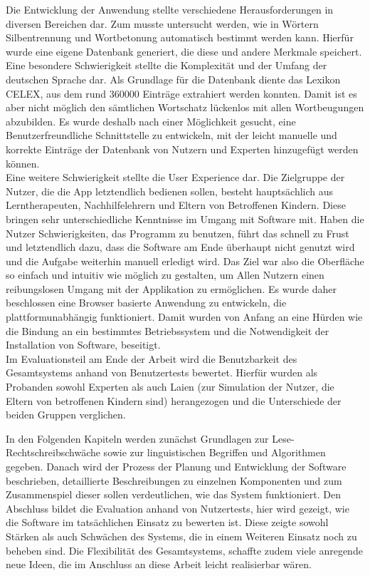 Die Entwicklung der Anwendung stellte verschiedene Herausforderungen in diversen Bereichen dar. Zum musste untersucht werden, wie in Wörtern Silbentrennung und Wortbetonung automatisch bestimmt werden kann. Hierfür wurde eine eigene Datenbank generiert, die diese und andere Merkmale speichert. Eine besondere Schwierigkeit stellte die Komplexität und der Umfang der deutschen Sprache dar. Als Grundlage für die Datenbank diente das Lexikon CELEX, aus dem rund 360000 Einträge extrahiert werden konnten. Damit ist es aber nicht möglich den sämtlichen Wortschatz lückenlos mit allen Wortbeugungen abzubilden. Es wurde deshalb nach einer Möglichkeit gesucht, eine Benutzerfreundliche Schnittstelle zu entwickeln, mit der leicht manuelle und korrekte Einträge der Datenbank von Nutzern und Experten hinzugefügt werden können.\\
Eine weitere Schwierigkeit stellte die User Experience dar. Die Zielgruppe der Nutzer, die die App letztendlich bedienen sollen, besteht hauptsächlich aus Lerntherapeuten, Nachhilfelehrern und Eltern von Betroffenen Kindern. Diese bringen sehr unterschiedliche Kenntnisse im Umgang mit Software mit. Haben die Nutzer Schwierigkeiten, das Programm zu benutzen, führt das schnell zu Frust und letztendlich dazu, dass die Software am Ende überhaupt nicht genutzt wird und die Aufgabe weiterhin manuell erledigt wird.  Das Ziel war also die Oberfläche so einfach und intuitiv wie möglich zu gestalten, um Allen Nutzern einen reibungslosen Umgang mit der Applikation zu ermöglichen. Es wurde daher beschlossen eine Browser basierte Anwendung zu entwickeln, die plattformunabhängig funktioniert. Damit wurden von Anfang an eine Hürden wie die Bindung an ein bestimmtes Betriebssystem und die Notwendigkeit der Installation von Software, beseitigt.\\
Im Evaluationsteil am Ende der Arbeit wird die Benutzbarkeit des Gesamtsystems anhand von Benutzertests bewertet. Hierfür wurden als Probanden sowohl Experten  als auch Laien (zur Simulation der Nutzer, die Eltern von betroffenen Kindern sind) herangezogen und die Unterschiede der beiden Gruppen verglichen.

In den Folgenden Kapiteln werden zunächst Grundlagen zur Lese-Rechtschreibschwäche sowie zur linguistischen Begriffen und Algorithmen gegeben. Danach wird der Prozess der Planung und Entwicklung der Software beschrieben, detaillierte Beschreibungen zu einzelnen Komponenten und zum Zusammenspiel dieser sollen verdeutlichen, wie das System funktioniert. Den Abschluss bildet die Evaluation anhand von Nutzertests, hier wird gezeigt, wie die Software im tatsächlichen Einsatz zu bewerten ist. Diese zeigte sowohl Stärken als auch Schwächen des Systems, die in einem Weiteren Einsatz noch zu beheben sind. Die Flexibilität des Gesamtsystems, schaffte zudem viele anregende neue Ideen, die im Anschluss an diese Arbeit leicht realisierbar wären.